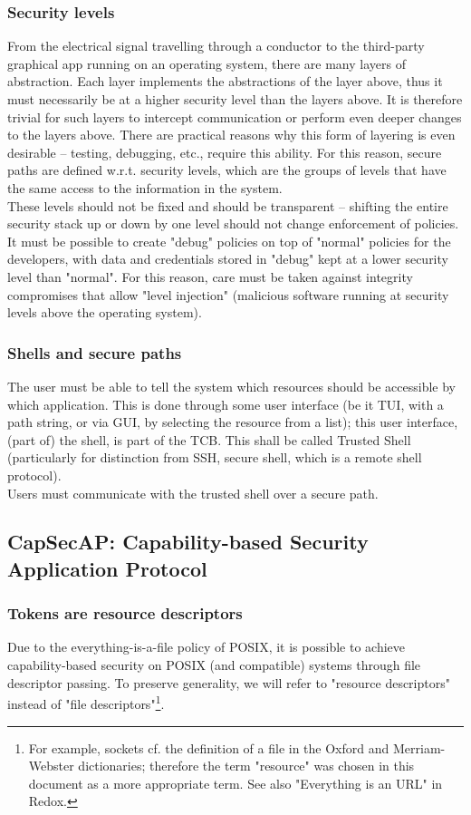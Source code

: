 \subsubsection{Security levels}
From the electrical signal travelling through a conductor to the third-party graphical app running on an operating system, there are many layers of abstraction. Each layer implements the abstractions of the layer above, thus it must necessarily be at a higher security level than the layers above. It is therefore trivial for such layers to intercept communication or perform even deeper changes to the layers above. There are practical reasons why this form of layering is even desirable -- testing, debugging, etc., require this ability. For this reason, secure paths are defined w.r.t. security levels, which are the groups of levels that have the same access to the information in the system.\\
These levels should not be fixed and should be transparent -- shifting the entire security stack up or down by one level should not change enforcement of policies. It must be possible to create "debug" policies on top of "normal" policies for the developers, with data and credentials stored in "debug" kept at a lower security level than "normal". For this reason, care must be taken against integrity compromises that allow "level injection" (malicious software running at security levels above the operating system).
\subsubsection{Shells and secure paths}
The user must be able to tell the system which resources should be accessible by which application. This is done through some user interface (be it TUI, with a path string, or via GUI, by selecting the resource from a list); this user interface, (part of) the shell, is part of the TCB. This shall be called Trusted Shell (particularly for distinction from SSH, secure shell, which is a remote shell protocol).\\
Users must communicate with the trusted shell over a secure path.
\subsection{CapSecAP: Capability-based Security Application Protocol}
\subsubsection{Tokens are resource descriptors}
Due to the everything-is-a-file policy of POSIX, it is possible to achieve capability-based security on POSIX (and compatible) systems through file descriptor passing. To preserve generality, we will refer to "resource descriptors" instead of "file descriptors"\footnote{For example, sockets cf. the definition of a file in the Oxford and Merriam-Webster dictionaries; therefore the term "resource" was chosen in this document as a more appropriate term. See also "Everything is an URL" in Redox.}.
